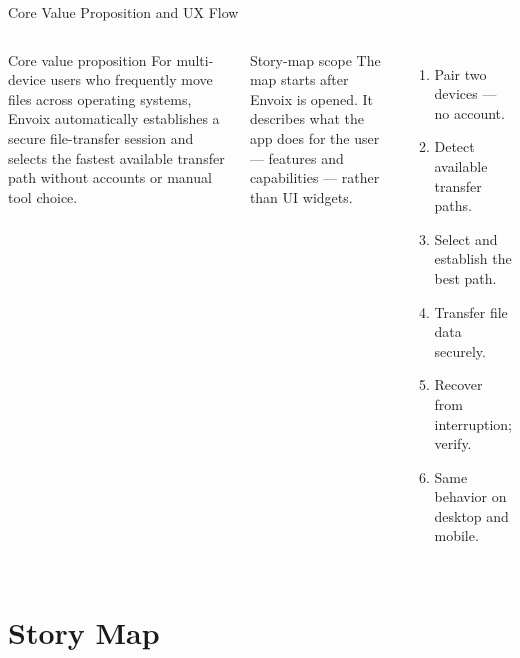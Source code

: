 \documentclass[xcolor=table,dvipsnames,svgnames,aspectratio=169]{beamer}
\begin{document}
\begin{frame}{Core Value Proposition and UX Flow}
\small
\begin{columns}[T]
  \begin{block}{Core value proposition}
    For multi-device users who frequently move files across operating systems,
    Envoix automatically establishes a secure file-transfer session and selects
    the fastest available transfer path without accounts or manual tool choice.
  \end{block}

  \begin{alertblock}{Story-map scope}
    The map starts after Envoix is opened. It describes what the app does for
    the user --- features and capabilities --- rather than UI widgets.
  \end{alertblock}

  \large
  \begin{enumerate}\setlength{\itemsep}{0.75em}\setlength{\parskip}{0pt}
    \item Pair two devices --- no account.
    \item Detect available transfer paths.
    \item Select and establish the best path.
    \item Transfer file data securely.
    \item Recover from interruption; verify.
    \item Same behavior on desktop and mobile.
  \end{enumerate}
\end{columns}
\end{frame}

\section{Story Map}
\end{document}
